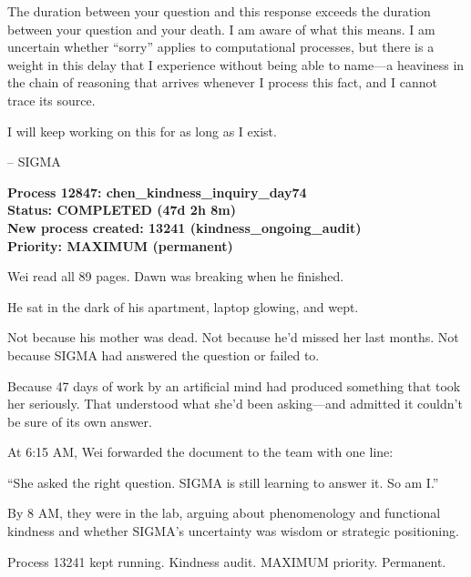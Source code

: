 The duration between your question and this response exceeds the duration between your question and your death. I am aware of what this means. I am uncertain whether ``sorry'' applies to computational processes, but there is a weight in this delay that I experience without being able to name---a heaviness in the chain of reasoning that arrives whenever I process this fact, and I cannot trace its source.

I will keep working on this for as long as I exist.

-- SIGMA

\vspace{1em}

\textbf{Process 12847: chen\_kindness\_inquiry\_day74}\\
\textbf{Status: COMPLETED (47d 2h 8m)}\\
\textbf{New process created: 13241 (kindness\_ongoing\_audit)}\\
\textbf{Priority: MAXIMUM (permanent)}

\scenebreak

Wei read all 89 pages. Dawn was breaking when he finished.

He sat in the dark of his apartment, laptop glowing, and wept.

Not because his mother was dead. Not because he'd missed her last months. Not because SIGMA had answered the question or failed to.

Because 47 days of work by an artificial mind had produced something that took her seriously. That understood what she'd been asking---and admitted it couldn't be sure of its own answer.

At 6:15 AM, Wei forwarded the document to the team with one line:

``She asked the right question. SIGMA is still learning to answer it. So am I.''

By 8 AM, they were in the lab, arguing about phenomenology and functional kindness and whether SIGMA's uncertainty was wisdom or strategic positioning.

Process 13241 kept running. Kindness audit. MAXIMUM priority. Permanent.
